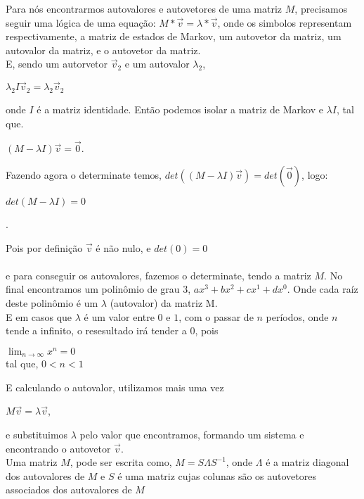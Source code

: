 \documentclass[14pt]{article}
\begin{document}
    Para nós encontrarmos autovalores e autovetores de uma matriz $M$, precisamos seguir uma lógica de uma equação:
$M * \vec{v} = \lambda * \vec{v}$,
onde os simbolos representam respectivamente, a matriz de estados de Markov, um autovetor da matriz, um autovalor da matriz, e o autovetor da matriz. \\

    E, sendo um autorvetor $\vec{v}_2$ e um autovalor $\lambda_2$,
\begin{center}
$\lambda_2 I \vec{v}_2 = \lambda_2 \vec{v}_2$
\end{center}

    onde $I$ é a matriz identidade.
Então podemos isolar a matriz de Markov e $\lambda I$, tal que.

\begin{center}
$(M-\lambda I)\vec{v} = \vec{0}$.\end{center}

Fazendo agora o determinate temos, 
$det((M-\lambda I)\vec{v}) = det(\vec{0})$, logo:

\begin{center}
    $det(M - \lambda I) = 0$
\end{center}.

Pois por definição $\vec{v}$ é não nulo, e $det(0) = 0$\\\\
e para conseguir os autovalores, fazemos o determinate, tendo a matriz $M$. No final encontramos um polinômio de grau 3,  $ax^3 + bx^2 + cx^1 + dx^0$. Onde cada raíz deste polinômio é um $\lambda$ (autovalor) da matriz M.\\

E em casos que $\lambda$ é um valor entre $0$ e $1$, com o passar de $n$ períodos, onde $n$ tende a infinito, o resesultado irá tender a $0$, pois\\
\begin{center}
$\lim_{n\to\infty} x^n = 0$\\ tal que,  $0 < n < 1$\end{center}

E calculando o autovalor, utilizamos mais uma vez\\
\begin{center}
    $M \vec{v} = \lambda \vec{v}$,
\end{center}
e substituimos $\lambda$ pelo valor que encontramos, formando um sistema e encontrando o autovetor $\vec{v}$.\\

Uma matriz $M$, pode ser escrita como, $M = S\Lambda S^{-1}$,
onde $\Lambda$ é a matriz diagonal dos autovalores de $M$ e $S$ é uma matriz cujas colunas são os autovetores associados dos autovalores de $M$\\
\end{document}
